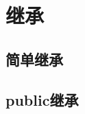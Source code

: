 \documentclass{../main.tex}{subfiles}
\begin{document}
\section{继承}
\subsection{简单继承}


\subsection{public继承}


\end{document}
